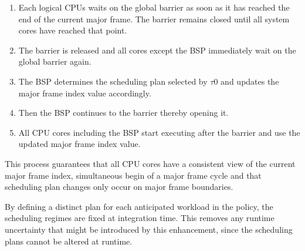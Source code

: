 \begin{enumerate}
	\item Each logical CPUs waits on the global barrier as soon as it has
		reached the end of the current major frame. The barrier remains closed
		until all system cores have reached that point.
	\item The barrier is released and all cores except the BSP immediately wait
		on the global barrier again.
	\item The BSP determines the scheduling plan selected by $\tau$0 and updates
		the major frame index value accordingly.
	\item Then the BSP continues to the barrier thereby opening it.
	\item All CPU cores including the BSP start executing after the barrier and
		use the updated major frame index value.
\end{enumerate}

This process guarantees that all CPU cores have a consistent view of the current
major frame index, simultaneous begin of a major frame cycle and that scheduling
plan changes only occur on major frame boundaries.

By defining a distinct plan for each anticipated workload in the policy, the
scheduling regimes are fixed at integration time. This removes any runtime
uncertainty that might be introduced by this enhancement, since the scheduling
plans cannot be altered at runtime.

